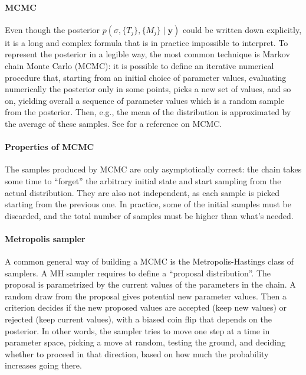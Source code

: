 \documentclass{article}
\begin{document}
    \paragraph{MCMC}

    Even though the posterior $p(\sigma, \{T_j\}, \{M_j\}\mid \mathbf y)$ could be written down explicitly, it is a long and complex formula that is in practice impossible to interpret. To represent the posterior in a legible way, the most common technique is Markov chain Monte Carlo (MCMC): it is possible to define an iterative numerical procedure that, starting from an initial choice of parameter values, evaluating numerically the posterior only in some points, picks a new set of values, and so on, yielding overall a sequence of parameter values which is a random sample from the posterior. Then, e.g., the mean of the distribution is approximated by the average of these samples. See \textcite{brooks2011} for a reference on MCMC.

    \paragraph{Properties of MCMC}

    The samples produced by MCMC are only asymptotically correct: the chain takes some time to ``forget'' the arbitrary initial state and start sampling from the actual distribution. They are also not independent, as each sample is picked starting from the previous one. In practice, some of the initial samples must be discarded, and the total number of samples must be higher than what's needed.

    \paragraph{Metropolis sampler}

    A common general way of building a MCMC is the Metropolis-Hastings class of samplers. A MH sampler requires to define a ``proposal distribution''. The proposal is parametrized by the current values of the parameters in the chain. A random draw from the proposal gives potential new parameter values. Then a criterion decides if the new proposed values are accepted (keep new values) or rejected (keep current values), with a biased coin flip that depends on the posterior. In other words, the sampler tries to move one step at a time in parameter space, picking a move at random, testing the ground, and deciding whether to proceed in that direction, based on how much the probability increases going there.
\end{document}
